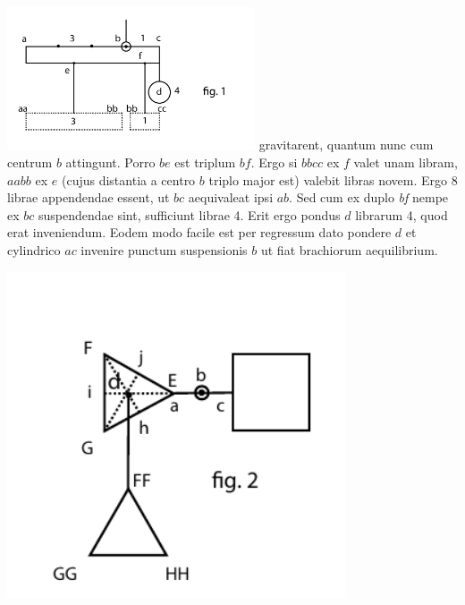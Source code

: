 \pend
\vspace{1em}
\pstart
\centering
\includegraphics[trim = -30mm 22mm 0mm 0mm, clip, width=0.55\textwidth]{images/LH037,05_135-d1.pdf}
\pend
\newpage
\count{}
\count{}
\count{}
\pstart \noindent gravitarent, quantum nunc cum centrum $b$ attingunt. Porro $be$ est triplum $bf$. Ergo si $bbcc$ ex $f$ valet unam libram\protect{}, $aabb$ ex $e$ (cujus distantia a centro $b$ triplo major est) valebit libras\protect{} novem. Ergo 8 librae  appendendae essent, ut $bc$ aequivaleat ipsi $ab$. Sed cum ex duplo \textit{bf} nempe ex $bc$ suspendendae sint, sufficiunt librae 4\protect{}. 
\pend
\pstart
Erit ergo pondus\protect{} $d$ librarum 4\protect{}, quod erat inveniendum. Eodem modo facile est per regressum dato pondere\protect{} $d$ et cylindrico $ac$ invenire punctum suspensionis $b$ ut fiat brachiorum aequilibrium\protect{}. 
\pend 
\pstart
\vspace*{1em}
\begin{minipage}[t]{0.5\textwidth}
\hspace{-9mm}
\includegraphics[width=0.75\textwidth]{images/LH037,05_135-d2.pdf}
\end{minipage}
